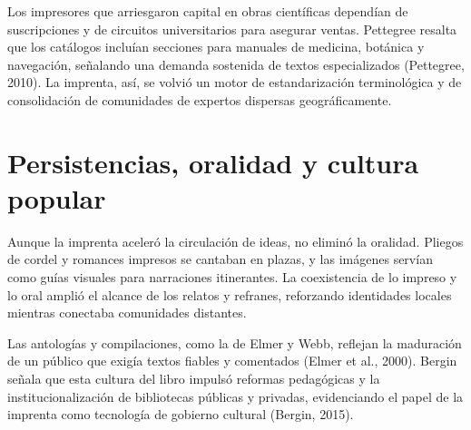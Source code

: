 Los impresores que arriesgaron capital en obras científicas dependían de suscripciones y de circuitos universitarios para asegurar ventas. Pettegree resalta que los catálogos incluían secciones para manuales de medicina, botánica y navegación, señalando una demanda sostenida de textos especializados (Pettegree, 2010). La imprenta, así, se volvió un motor de estandarización terminológica y de consolidación de comunidades de expertos dispersas geográficamente.

\section{Persistencias, oralidad y cultura popular}
Aunque la imprenta aceleró la circulación de ideas, no eliminó la oralidad. Pliegos de cordel y romances impresos se cantaban en plazas, y las imágenes servían como guías visuales para narraciones itinerantes. La coexistencia de lo impreso y lo oral amplió el alcance de los relatos y refranes, reforzando identidades locales mientras conectaba comunidades distantes.

Las antologías y compilaciones, como la de Elmer y Webb, reflejan la maduración de un público que exigía textos fiables y comentados (Elmer et al., 2000). Bergin señala que esta cultura del libro impulsó reformas pedagógicas y la institucionalización de bibliotecas públicas y privadas, evidenciando el papel de la imprenta como tecnología de gobierno cultural (Bergin, 2015).
